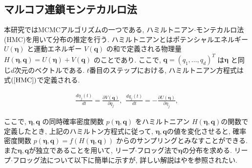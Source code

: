 \documentclass[a4j,12pt]{jarticle}
\begin{document}
\subsection{マルコフ連鎖モンテカルロ法}

本研究ではMCMCアルゴリズムの一つである, ハミルトニアン$\cdot$モンテカルロ法(HMC)を用いて分布の推定を行う. 
ハミルトニアンとはポテンシャルエネルギー $U(\bm \eta)$ と運動エネルギー $V(\bm q)$ の和で定義される物理量 $H(\bm \eta, \bm q) = U(\bm \eta) + V(\bm q)$ のことであり. ここで, $\bm q = (q_1, \dots, q_d)^T$ は$\bm \eta$ と同じ$d$次元のベクトルである. $t$番目のステップにおける, ハミルトニアン方程式は式$(\ref{HMC})$で定義される. 

\begin{eqnarray}
\label{HMC}
\frac{d \eta_j(t)}{dt} = \frac{\partial V(\bm q)}{\partial q_j},\ \ \frac{d q_j(t)}{dt} = - \frac{\partial U(\bm \eta)}{\partial \eta_j},
\end{eqnarray}

\noindent
ここで, $\bm \eta, \bm q$ の同時確率密度関数 $p(\bm \eta, \bm q)$ をハミルトニアン $H(\bm \eta, \bm q)$の関数で定義したとき, 上記のハミルトン方程式に従って, $\bm \eta, \bm q$の値を変化させると, 確率密度関数 $p(\bm \eta, \bm q) = f(H(\bm \eta, \bm q))$ からのサンプリングとみなすことができる. また$\bm \eta, \bm q$が独立であることを用いて, リープ$\cdot$フロッグ法で$\bm \eta$の分布を求める. リープ$\cdot$フロッグ法について以下に簡単に示すが, 詳しい解説は\citet{HMC}や\citet{NUTS}を参照されたい.
\end{document}
